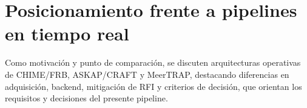 \section{Posicionamiento frente a pipelines en tiempo real}
Como motivación y punto de comparación, se discuten arquitecturas operativas de CHIME/FRB, ASKAP/CRAFT y MeerTRAP, destacando diferencias en adquisición, backend, mitigación de RFI y criterios de decisión, que orientan los requisitos y decisiones del presente pipeline.